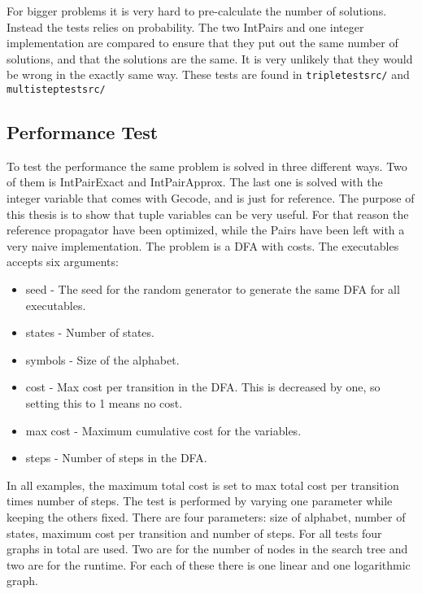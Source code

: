 \documentclass[a4paper,11pt]{article}
\begin{document}
For bigger problems it is very hard to pre-calculate the number of solutions. Instead the tests relies on probability. The two IntPairs and one integer implementation are compared to ensure that they put out the same number of solutions, and that the solutions are the same. It is very unlikely that they would be wrong in the exactly same way. These tests are found in \texttt{tripletestsrc/} and \texttt{multisteptestsrc/}

\subsection{Performance Test}
To test the performance the same problem is solved in three different ways. Two of them is IntPairExact and IntPairApprox. The last one is solved with the integer variable that comes with Gecode, and is just for reference. The purpose of this thesis is to show that tuple variables can be very useful. For that reason the reference propagator have been optimized, while the Pairs have been left with a very naive implementation. The problem is a DFA with costs. The executables accepts six arguments: 
\begin{itemize}
\item{seed} - The seed for the random generator to generate the same DFA for all executables.
\item{states} - Number of states.
\item{symbols} - Size of the alphabet.
\item{cost} - Max cost per transition in the DFA. This is decreased by one, so setting this to 1 means no cost.
\item{max cost} - Maximum cumulative cost for the variables.
\item{steps} - Number of steps in the DFA.
\end{itemize}
In all examples, the maximum total cost is set to max total cost per transition times number of steps. The test is performed by varying one parameter while keeping the others fixed. There are four parameters: size of alphabet, number of states, maximum cost per transition and number of steps. For all tests four graphs in total are used. Two are for the number of nodes in the search tree and two are for the runtime. For each of these there is one linear and one logarithmic graph.


\end{document}
